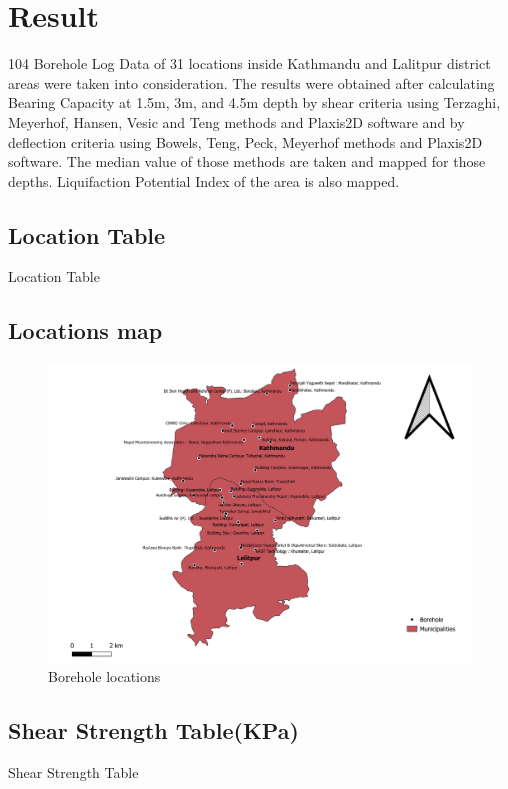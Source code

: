 \chapter{Result}
104 Borehole Log Data of 31 locations inside Kathmandu and Lalitpur district areas were taken into consideration. The results were obtained after calculating Bearing Capacity at 1.5m, 3m, and 4.5m depth by shear criteria using Terzaghi, Meyerhof, Hansen, Vesic and Teng methods and Plaxis2D software and by deflection criteria using Bowels, Teng, Peck, Meyerhof  methods and Plaxis2D software. The median value of those methods are taken and mapped for those depths. Liquifaction Potential Index of the area is also mapped.
\pagebreak

\section{Location Table}
\begin{table}[!h]
\caption{Location Table}

\end{table}
\pagebreak

\section{Locations map}
\begin{figure}[!hbt]
\centering
\includegraphics[width=\linewidth, height=\textheight,keepaspectratio]{in/map/Borehole2.png}
\caption{Borehole locations}
\end{figure}
\pagebreak

\section{Shear Strength Table(KPa)}
\begin{table}[!h]
\caption{Shear Strength Table}

\end{table}
\pagebreak

